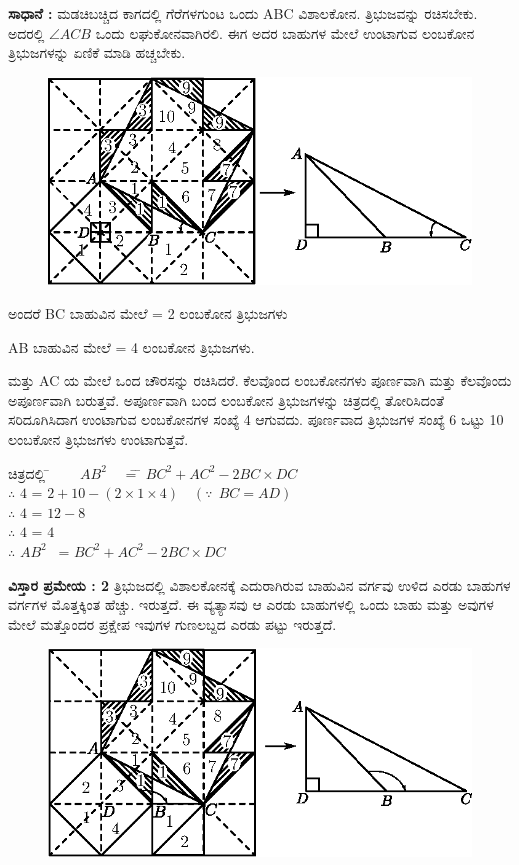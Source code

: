 \noindent
\textbf{ಸಾಧಾನೆ :} ಮಡಚಿಬಚ್ಚಿದ ಕಾಗದಲ್ಲಿ ಗೆರೆಗಳಗುಂಟ ಒಂದು ABC ವಿಶಾಲಕೋನ. ತ್ರಿಭುಜವನ್ನು ರಚಿಸಬೇಕು. ಅದರಲ್ಲಿ $\angle ACB$ ಒಂದು ಲಘುಕೋನವಾಗಿರಲಿ. ಈಗ ಅದರ ಬಾಹುಗಳ ಮೇಲೆ ಉಂಟಾಗುವ ಲಂಬಕೋನ ತ್ರಿಭುಜಗಳನ್ನು ಏಣಿಕೆ ಮಾಡಿ ಹಚ್ಚಬೇಕು. 
\begin{figure}[H]
\centering
\includegraphics[scale=.9]{src/figure/chap1/fig1-17f.eps}
\end{figure} 

ಅಂದರೆ BC ಬಾಹುವಿನ ಮೇಲೆ = 2 ಲಂಬಕೋನ  ತ್ರಿಭುಜಗಳು 

AB ಬಾಹುವಿನ ಮೇಲೆ = 4 ಲಂಬಕೋನ ತ್ರಿಭುಜಗಳು. 

ಮತ್ತು AC ಯ ಮೇಲೆ ಒಂದ ಚೌರಸನ್ನು ರಚಿಸಿದರೆ. ಕೆಲವೊಂದ ಲಂಬಕೋನಗಳು ಪೂರ್ಣವಾಗಿ ಮತ್ತು ಕೆಲವೊಂದು ಅಪೂರ್ಣವಾಗಿ ಬರುತ್ತವೆ. ಅಪೂರ್ಣವಾಗಿ ಬಂದ ಲಂಬಕೋನ ತ್ರಿಭುಜಗಳನ್ನು ಚಿತ್ರದಲ್ಲಿ ತೋರಿಸಿದಂತೆ ಸರಿದೂಗಿಸಿದಾಗ ಉಂಟಾಗುವ ಲಂಬಕೋನಗಳ ಸಂಖ್ಯೆ  4 ಆಗುವದು.  ಪೂರ್ಣವಾದ ತ್ರಿಭುಜಗಳ ಸಂಖ್ಯೆ  6 ಒಟ್ಟು 10 ಲಂಬಕೋನ ತ್ರಿಭುಜಗಳು ಉಂಟಾಗುತ್ತವೆ. 

\begin{tabbing}
 ಚಿತ್ರದಲ್ಲಿ \quad 	\= ~~~ 			$AB^2$~~ \= =  \= $BC^2 + AC^2 - 2 BC \times DC$\\
  $\therefore$ \> \quad $4$ \>  = \> $2+10- (2\times 1 \times 4) \quad (\because  ~~ BC = AD)$\\
   $\therefore$ \> \quad  $4$ \> = \> $12-8$\\
   $\therefore$ \> \quad $4 $ \> = \> $4$ \\
 $\therefore $ \>  $AB^2$~ \> = \> $BC^2 + AC^2 - 2 BC \times DC$
\end{tabbing}

\noindent
\textbf{ವಿಸ್ತಾರ ಪ್ರಮೇಯ : 2}
ತ್ರಿಭುಜದಲ್ಲಿ ವಿಶಾಲಕೋನಕ್ಕೆ ಎದುರಾಗಿರುವ ಬಾಹುವಿನ ವರ್ಗವು ಉಳಿದ ಎರಡು ಬಾಹುಗಳ ವರ್ಗಗಳ ಮೊತ್ತಕ್ಕಿಂತ ಹೆಚ್ಚು. ಇರುತ್ತದೆ. ಈ ವ್ಯತ್ಯಾಸವು ಆ ಎರಡು ಬಾಹುಗಳಲ್ಲಿ ಒಂದು ಬಾಹು ಮತ್ತು ಅವುಗಳ ಮೇಲೆ ಮತ್ತೊಂದರ ಪ್ರಕ್ಷೇಪ ಇವುಗಳ ಗುಣಲಬ್ದದ ಎರಡು ಪಟ್ಟು ಇರುತ್ತದೆ. 
\begin{figure}[H]
\centering
\includegraphics[scale=.95]{src/figure/chap1/fig1-17g.eps}
\end{figure}

